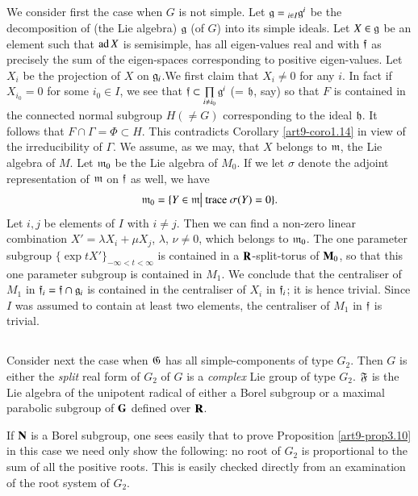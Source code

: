 \subsection{}\label{art9-subsec3.11}
We consider first the case when $G$ is not simple. Let $\mathfrak{g} ={}_{i \in I} \mathfrak{g}^{i}$ be the decomposition of (the Lie algebra) $\mathfrak{g}$ (of $G$) into its simple ideals. Let $X \in \mathfrak{g}$ be an element such that $\operatorname{ad} X$ is semisimple, has all eigen-values real and with $\mathfrak{f}$ as precisely the sum of the eigen-spaces corresponding to positive eigen-values. Let $X_i$ be the projection of $X$ on $\mathfrak{g}_i$.\pageoriginale We first claim that $X_i \neq 0$ for any $i$. In fact if $X_{i_0} = 0$ for some $i_0 \in I$, we see that $\mathfrak{f} \subset \prod\limits_{i \neq i_0} \mathfrak{g}^i$ (= $\mathfrak{h}$, say) so that $F$ is contained in the connected normal subgroup $H(\neq G)$ corresponding to the ideal $\mathfrak{h}$. It follows that $F \cap\Gamma = \Phi \subset H$. This contradicts Corollary \ref{art9-coro1.14} in view of the irreducibility of $\Gamma$. We assume, as we may, that $X$ belongs to $\mathfrak{m}$, the Lie algebra of $M$. Let $\mathfrak{m}_0$ be the Lie algebra of $M_0$. If we let $\sigma$ denote the adjoint representation of $\mathfrak{m}$ on $\mathfrak{f}$ as well, we have
$$
\mathfrak{m}_0 = \{Y \in \mathfrak{m} \big| \text{ trace } \sigma (Y) =0\}.
$$
Let $i, j$ be elements of $I$ with $i \neq j$. Then we can find a non-zero linear combination $X' = \lambda X_i + \mu X_j$, $\lambda$, $\nu \neq 0$, which belongs to $\mathfrak{m}_0$. The one parameter subgroup $\{\exp t X'\}_{-\infty < t < \infty}$ is contained in a $\mathbf{R}$-split-torus of $\mathbf{M}_0$, so that this one parameter subgroup is contained in $M_1$. We conclude that the centraliser of $M_1$ in $\mathfrak{f}_i = \mathfrak{f} \cap \mathfrak{g}_i$ is contained in the centraliser of $X_i$ in $\mathfrak{f}_i$; it is hence trivial. Since $I$ was assumed to contain at least two elements, the centraliser of $M_1$ in $\mathfrak{f}$ is trivial.

\subsection{}\label{art9-subsec3.12}
Consider next the case when $\mathfrak{G}$ has all simple-components of type $G_2$. Then $G$ is either the \textit{split} real form of $G_2$ of $G$ is a \textit{complex} Lie group of type $G_2$. $\mathfrak{F}$ is the Lie algebra of the unipotent radical of either a Borel subgroup or a maximal parabolic subgroup of $\mathbf{G}$ defined over $\mathbf{R}$.

If $\mathbf{N}$ is a Borel subgroup, one sees easily that to prove Proposition \ref{art9-prop3.10} in this case we need only show the following: no root of $G_2$ is proportional to the sum of all the positive roots. This is easily checked directly from an examination of the root system of $G_2$.

